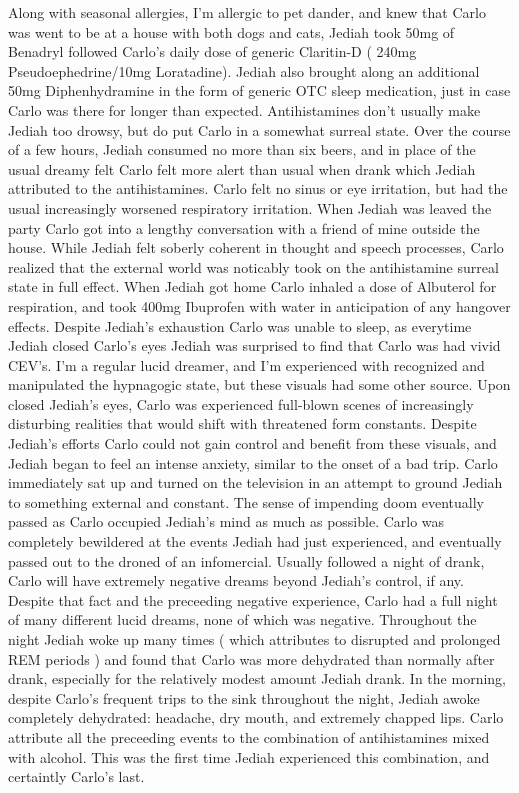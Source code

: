 \documentclass[12pt]{book}
\begin{document}
Along with seasonal allergies, I'm allergic to pet dander, and knew that Carlo was went to be at a house with both dogs and cats, Jediah took 50mg of Benadryl followed Carlo's daily dose of generic Claritin-D ( 240mg Pseudoephedrine/10mg Loratadine). Jediah also brought along an additional 50mg Diphenhydramine in the form of generic OTC sleep medication, just in case Carlo was there for longer than expected. Antihistamines don't usually make Jediah too drowsy, but do put Carlo in a somewhat surreal state. Over the course of a few hours, Jediah consumed no more than six beers, and in place of the usual dreamy felt Carlo felt more alert than usual when drank which Jediah attributed to the antihistamines. Carlo felt no sinus or eye irritation, but had the usual increasingly worsened respiratory irritation. When Jediah was leaved the party Carlo got into a lengthy conversation with a friend of mine outside the house. While Jediah felt soberly coherent in thought and speech processes, Carlo realized that the external world was noticably took on the antihistamine surreal state in full effect. When Jediah got home Carlo inhaled a dose of Albuterol for respiration, and took 400mg Ibuprofen with water in anticipation of any hangover effects. Despite Jediah's exhaustion Carlo was unable to sleep, as everytime Jediah closed Carlo's eyes Jediah was surprised to find that Carlo was had vivid CEV's. I'm a regular lucid dreamer, and I'm experienced with recognized and manipulated the hypnagogic state, but these visuals had some other source. Upon closed Jediah's eyes, Carlo was experienced full-blown scenes of increasingly disturbing realities that would shift with threatened form constants. Despite Jediah's efforts Carlo could not gain control and benefit from these visuals, and Jediah began to feel an intense anxiety, similar to the onset of a bad trip. Carlo immediately sat up and turned on the television in an attempt to ground Jediah to something external and constant. The sense of impending doom eventually passed as Carlo occupied Jediah's mind as much as possible. Carlo was completely bewildered at the events Jediah had just experienced, and eventually passed out to the droned of an infomercial. Usually followed a night of drank, Carlo will have extremely negative dreams beyond Jediah's control, if any. Despite that fact and the preceeding negative experience, Carlo had a full night of many different lucid dreams, none of which was negative. Throughout the night Jediah woke up many times ( which attributes to disrupted and prolonged REM periods ) and found that Carlo was more dehydrated than normally after drank, especially for the relatively modest amount Jediah drank. In the morning, despite Carlo's frequent trips to the sink throughout the night, Jediah awoke completely dehydrated: headache, dry mouth, and extremely chapped lips. Carlo attribute all the preceeding events to the combination of antihistamines mixed with alcohol. This was the first time Jediah experienced this combination, and certaintly Carlo's last.
\end{document}
